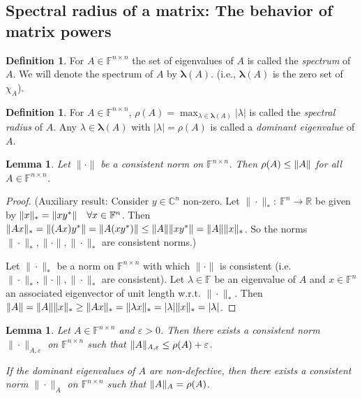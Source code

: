 \documentclass[12pt]{article}
\newtheorem{lemma}[theorem]{Lemma}
\theoremstyle{definition}
\newtheorem{definition}[theorem]{Definition}
\theoremstyle{remark}
\numberwithin{equation}{section}
\newcommand{\F}{\mathbb{F}}
\newcommand{\R}{\mathbb{R}}
\newcommand{\C}{\mathbb{C}}
\newcommand{\normempty}{\|\cdot\|}
\newcommand{\spectrum}[1]{\bm{\lambda}(#1)}
\DeclarePairedDelimiter{\norm}{\lVert}{\rVert}
\begin{document}
\subsection*{Spectral radius of a matrix: The behavior of matrix powers}

\begin{definition}
  For $A \in \F^{n \times n}$ the set of eigenvalues of $A$ is called the \emph{spectrum} of $A$. We will denote the spectrum of $A$ by $\spectrum{A}$. (i.e., $\spectrum{A}$ is the zero set of $\chi_A$).
\end{definition}

\begin{definition}
  For $A \in \F^{n \times n}$, $\rho(A) = \max_{\lambda \in \spectrum{A}} |\lambda|$ is called the \emph{spectral radius} of $A$. Any $\lambda \in \spectrum{A}$ with $|\lambda| = \rho(A)$ is called a \emph{dominant eigenvalue} of $A$.
\end{definition}

\begin{lemma}
  Let $\normempty$ be a consistent norm on $\F^{n \times n}$. Then $\rho(A) \leq \norm{A}$ for all $A \in \F^{n \times n}$.
\end{lemma}

\begin{proof}
  (Auxiliary result: Consider $y \in \C^n$ non-zero. Let $\normempty_*:\ \F^n \rightarrow \R$ be given by $\norm{x}_* = \norm{xy^*} \quad \forall x \in \F^n$. Then $\norm{Ax}_* = \norm{(Ax)y^*} = \norm{A(xy^*)} \leq \norm{A} \norm{xy^*} = \norm{A} \norm{x}_*$. So the norms $\normempty_*, \normempty, \normempty_*$ are consistent norms.)

  Let $\normempty_{*}$ be a norm on $\F^{n \times n}$ with which $\normempty$ is consistent (i.e. $\normempty_{*}, \normempty, \normempty_{*}$ are consistent). Let  $\lambda \in \F$ be an eigenvalue of $A$ and $x \in \F^n$ an associated eigenvector of unit length w.r.t. $\normempty_{*}$. Then $\norm{A} = \norm{A}\norm{x}_* \geq \norm{Ax}_* = \norm{\lambda x}_* = |\lambda| \norm{x}_* = |\lambda|$.
\end{proof}

\begin{lemma}
  \label{lem:consistent-norms-spectral-radius}
  Let $A \in \F^{n \times n}$ and $\varepsilon > 0$. Then there exists a consistent norm $\normempty_{A,\varepsilon}$ on $\F^{n \times n}$ such that $\norm{A}_{A,\varepsilon} \leq \rho(A) + \varepsilon$.

  If the dominant eigenvalues of $A$ are non-defective, then there exists a consistent norm $\normempty_{A}$ on $\F^{n \times n}$ such that $\norm{A}_{A} = \rho(A)$.
\end{lemma}
\end{document}
